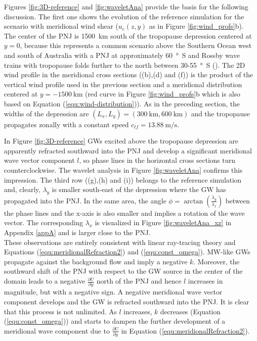 Figures \ref{fig:3D-reference} and \ref{fig:waveletAna} provide the basis for the following discussion. The first one shows the evolution of the reference simulation for the scenario with meridional wind shear ($u_e(z,y)$ as in Figure \ref{fig:wind_profs}b). The center of the PNJ is \SI{1500}{\kilo\meter} south of the tropopause depression centered at $y=0$, because this represents a common scenario above the Southern Ocean west and south of Australia with a PNJ at approximately \SI{60}{\degree S} and Rossby wave trains with tropopause folds further to the north between 30-\SI{55}{\degree S} (\cite[]{skerlak_tropopause_2015}). The 2D wind profile in the meridional cross sections ((b),(d) and (f)) is the product of the vertical wind profile used in the previous section and a meridional distribution centered at $y=\SI{-1500}{\kilo\meter}$ (red curve in Figure \ref{fig:wind_profs}b which is also based on Equation (\ref{equ:wind-distribution})). As in the preceding section, the widths of the depression are $(L_x,L_y)=(\SI{300}{\kilo\meter},\SI{600}{\kilo\meter})$ and the tropopause propagates zonally with a constant speed $c_{tf}=\SI{13.88}{\meter\per\second}$.

In Figure \ref{fig:3D-reference} GWs excited above the tropopause depression are apparently refracted southward into the PNJ and develop a significant meridional wave vector component $l$, so phase lines in the horizontal cross sections turn counterclockwise. The wavelet analysis in Figure \ref{fig:waveletAna} confirms this impression. The third row ((g),(h) and (i)) belongs to the reference simulation and, clearly, $\lambda_y$ is smaller south-east of the depression where the GW has propagated into the PNJ. In the same area, the angle $\phi=\arctan(\frac{\lambda_y}{\lambda_x})$ between the phase lines and the x-axis is also smaller and implies a rotation of the wave vector. The corresponding $\lambda_x$ is visualized in Figure \ref{fig:waveletAna_xz} in Appendix \ref{appA} and is larger close to the PNJ. \\
These observations are entirely consistent with linear ray-tracing theory and Equations (\ref{equ:meridionalRefraction2}) and (\ref{equ:const_omega}). MW-like GWs propagate against the background flow and imply a negative $k$. Moreover, the southward shift of the PNJ with respect to the GW source in the center of the domain leads to a negative $\frac{\partial U}{\partial y}$ north of the PNJ and hence $l$ increases in magnitude, but with a negative sign. A negative meridional wave vector component develops and the GW is refracted southward into the PNJ. It is clear that this process is not unlimited. As $l$ increases, $k$ decreases (Equation (\ref{equ:const_omega})) and starts to dampen the further development of a meridional wave component due to $\frac{\partial U}{\partial y}$ in Equation (\ref{equ:meridionalRefraction2}).

